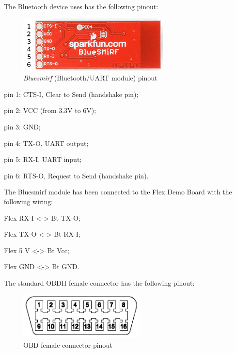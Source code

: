 \documentclass[twoside]{article}
\begin{document}
\begin{multicols}{2}
The Bluetooth device uses has the following pinout:

\begin{figure}[H]
  \centering
  \includegraphics[width=3in]{img/bluesmirf_pinout}
  \caption{\textit{Bluesmirf} (Bluetooth/UART module) pinout}
\end{figure}

\begin{compactitem}
\item pin 1: CTS-I, Clear to Send (handshake pin);
\item pin 2: VCC (from 3.3V to 6V);
\item pin 3: GND;
\item pin 4: TX-O, UART output;
\item pin 5: RX-I, UART input;
\item pin 6: RTS-O, Request to Send (handshake pin).
\end{compactitem}

The Bluesmirf module has been connected to the Flex Demo Board with the following wiring:

\begin{compactitem}
\item Flex RX-I <-> Bt TX-O;
\item Flex TX-O <-> Bt RX-I;
\item Flex 5 V <-> Bt Vcc;
\item Flex GND <-> Bt GND.
\end{compactitem}

The standard OBDII female connector has the following pinout:

\begin{figure}[H]
  \centering
  \includegraphics[width=2.5in]{img/J1962_female_pinout}
  \caption{OBD female connector pinout}
\end{figure}


\end{multicols}
\end{document}
